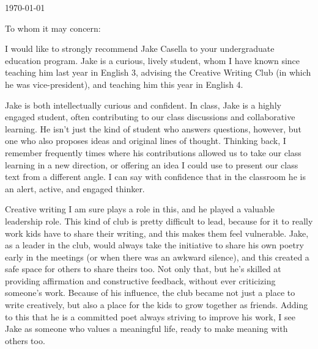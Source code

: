 \documentclass[11pt, letterpaper]{letter} %
\begin{document}

\begin{letter}{
	\today\\	
}


\opening{To whom it may concern:}

I would like to strongly recommend Jake Casella to your undergraduate education program. Jake is a curious, lively student, whom I have known since teaching him last year in English 3, advising the Creative Writing Club (in which he was vice-president), and teaching him this year in English 4.

Jake is both intellectually curious and confident. In class, Jake is a highly engaged student, often contributing to our class discussions and collaborative learning. He isn't just the kind of student who answers questions, however, but one who also proposes ideas and original lines of thought. Thinking back, I remember frequently times where his contributions allowed us to take our class learning in a new direction, or offering an idea I could use to present our class text from a different angle. I can say with confidence that in the classroom he is an alert, active, and engaged thinker.

Creative writing I am sure plays a role in this, and he played a valuable leadership role. This kind of club is pretty difficult to lead, because for it to really work kids have to share their writing, and this makes them feel vulnerable. Jake, as a leader in the club, would always take the initiative to share his own poetry early in the meetings (or when there was an awkward silence), and this created a safe space for others to share theirs too. Not only that, but he's skilled at providing affirmation and constructive feedback, without ever criticizing someone's work. Because of his influence, the club became not just a place to write creatively, but also a place for the kids to grow together as friends. Adding to this that he is a committed poet always striving to improve his work, I see Jake as someone who values a meaningful life, ready to make meaning with others too.


\end{letter}
\end{document}
